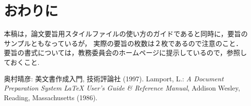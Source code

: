 \documentclass[twocolumn,a4paper]{jarticle}
\begin{document}
\section{おわりに}
本稿は，論文要旨用スタイルファイルの使い方のガイドであると同時に，要旨のサンプルともなっているが，
実際の要旨の枚数は２枚であるので注意のこと．
要旨の書式については，教務委員会のホームページに提示しているので，参照しておくこと.

\begin{thebibliography}{9}
奥村晴彦: {\LaTeXe} 美文書作成入門, 技術評論社 (1997).
Lamport, L.: {\em A Document Preparation System {\LaTeX} User's Guide \&
  Reference Manual\/}, Addison Wesley, Reading, Massachusetts (1986).
\end{thebibliography}
\end{document}
